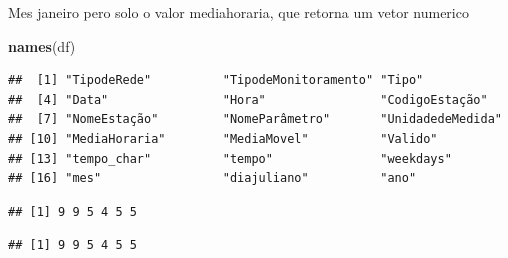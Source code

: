 \documentclass[]{book}
\newenvironment{Shaded}{\begin{snugshade}}{\end{snugshade}}
\newcommand{\KeywordTok}[1]{\textcolor[rgb]{0.13,0.29,0.53}{\textbf{#1}}}
\newcommand{\DecValTok}[1]{\textcolor[rgb]{0.00,0.00,0.81}{#1}}
\newcommand{\StringTok}[1]{\textcolor[rgb]{0.31,0.60,0.02}{#1}}
\newcommand{\OperatorTok}[1]{\textcolor[rgb]{0.81,0.36,0.00}{\textbf{#1}}}
\newcommand{\NormalTok}[1]{#1}
\theoremstyle{definition}
\theoremstyle{definition}
\theoremstyle{definition}
\theoremstyle{remark}
\begin{document}
Mes janeiro pero solo o valor mediahoraria, que retorna um vetor
numerico

\begin{Shaded}
\begin{Highlighting}[]
\KeywordTok{names}\NormalTok{(df)}
\end{Highlighting}
\end{Shaded}

\begin{verbatim}
##  [1] "TipodeRede"          "TipodeMonitoramento" "Tipo"               
##  [4] "Data"                "Hora"                "CodigoEstação"      
##  [7] "NomeEstação"         "NomeParâmetro"       "UnidadedeMedida"    
## [10] "MediaHoraria"        "MediaMovel"          "Valido"             
## [13] "tempo_char"          "tempo"               "weekdays"           
## [16] "mes"                 "diajuliano"          "ano"
\end{verbatim}

\begin{Shaded}
\end{Shaded}

\begin{verbatim}
## [1] 9 9 5 4 5 5
\end{verbatim}

\begin{Shaded}
\end{Shaded}

\begin{verbatim}
## [1] 9 9 5 4 5 5
\end{verbatim}

\begin{Shaded}
\end{Shaded}
\end{document}
